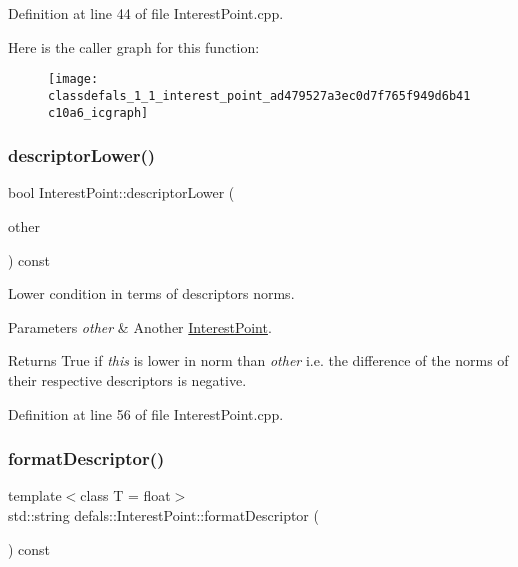 Definition at line 44 of file Interest\+Point.\+cpp.

Here is the caller graph for this function\+:\nopagebreak
\begin{figure}[H]
\begin{center}
\leavevmode
\texttt{[image: classdefals\_1\_1\_interest\_point\_ad479527a3ec0d7f765f949d6b41c10a6\_icgraph]}
\end{center}
\end{figure}
\mbox{\label{classdefals_1_1_interest_point_aba9dc4741dd4631df0d1e7567eea9bc4}} 
\subsubsection{\texorpdfstring{descriptor\+Lower()}{descriptorLower()}}
{\footnotesize\ttfamily bool Interest\+Point\+::descriptor\+Lower (\begin{DoxyParamCaption}\item[{const \hyperlink{classdefals_1_1_interest_point}{Interest\+Point} \&}]{other }\end{DoxyParamCaption}) const}

Lower condition in terms of descriptors\textquotesingle{} norms.


\begin{DoxyParams}{Parameters}
{\em other} & Another \hyperlink{classdefals_1_1_interest_point}{Interest\+Point}.\\
\hline
\end{DoxyParams}
\begin{DoxyReturn}{Returns}
True if {\itshape this} is lower in norm than {\itshape other} i.\+e. the difference of the norms of their respective descriptors is negative. 
\end{DoxyReturn}


Definition at line 56 of file Interest\+Point.\+cpp.

\mbox{\label{classdefals_1_1_interest_point_a47d55468ef29a100ed6c118e5bf21ae8}} 
\subsubsection{\texorpdfstring{format\+Descriptor()}{formatDescriptor()}}
{\footnotesize\ttfamily template$<$class T  = float$>$ \\
std\+::string defals\+::\+Interest\+Point\+::format\+Descriptor (\begin{DoxyParamCaption}{ }\end{DoxyParamCaption}) const\hspace{0.3cm}{\ttfamily [inline]}}

